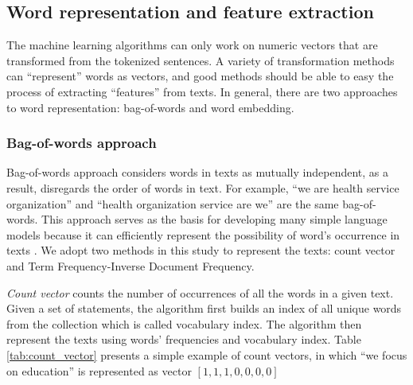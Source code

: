 \documentclass[11pt]{article}
\begin{document}


\subsection{Word representation and feature extraction}

The machine learning algorithms can only work on numeric vectors that are transformed from the tokenized sentences. A variety of transformation methods can ``represent'' words as vectors, and good methods should be able to easy the process of extracting ``features'' from texts. In general, there are two approaches to word representation: bag-of-words and word embedding.

\subsubsection{Bag-of-words approach}

Bag-of-words approach considers words in texts as mutually independent, as a result, disregards the order of words in text. For example, ``we are health service organization'' and ``health organization service are we'' are the same bag-of-words. This approach serves as the basis for developing many simple language models because it can efficiently represent the possibility of word's occurrence in texts \parencite{BengfortAppliedTextAnalysis2018}. We adopt two methods in this study to represent the texts: count vector and Term Frequency-Inverse Document Frequency.

\textit{Count vector} counts the number of occurrences of all the words in a given text. Given a set of statements, the algorithm first builds an index of all unique words from the collection which is called vocabulary index. The algorithm then represent the texts using words' frequencies and vocabulary index. Table \ref{tab:count_vector} presents a simple example of count vectors, in which ``we focus on education'' is represented as vector $[1, 1, 1, 0, 0, 0, 0]$
\end{document}
